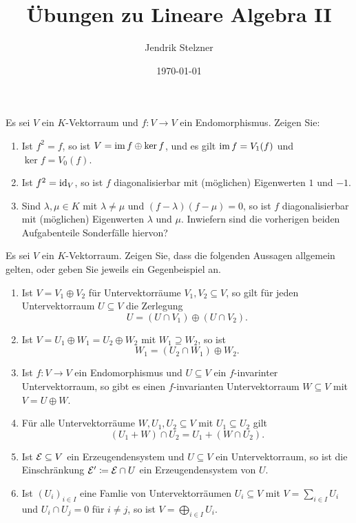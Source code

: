 \documentclass[a4paper,10pt]{scrartcl}
\title{Übungen zu Lineare Algebra II}
\author{Jendrik Stelzner}
\date{\today}
\begin{document}
\maketitle





\begin{question}
  Es sei $V$ ein $K$-Vektorraum und $f \colon V \to V$ ein Endomorphismus.
  Zeigen Sie:
  \begin{enumerate}[leftmargin=*]
    \item
      Ist $f^2 = f$, so ist $V = \operatorname{im} f \oplus \ker f$, und es gilt $\operatorname{im} f = V_1(f)$ und $\ker f = V_0(f)$.
    \item
      Ist $f^2 = \operatorname{id}_V$, so ist $f$ diagonalisierbar mit (möglichen) Eigenwerten $1$ und $-1$.
    \item
      Sind $\lambda, \mu \in K$ mit $\lambda \neq \mu$ und $(f-\lambda)(f-\mu) = 0$, so ist $f$ diagonalisierbar mit (möglichen) Eigenwerten $\lambda$ und $\mu$.
      Inwiefern sind die vorherigen beiden Aufgabenteile Sonderfälle hiervon?
  \end{enumerate}
\end{question}


\begin{question}
  Es sei $V$ ein $K$-Vektorraum.
  Zeigen Sie, dass die folgenden Aussagen allgemein gelten, oder geben Sie jeweils ein Gegenbeispiel an.
  \begin{enumerate}[leftmargin=*]
    \item
      Ist $V = V_1 \oplus V_2$ für Untervektorräume $V_1, V_2 \subseteq V$, so gilt für jeden Untervektorraum $U \subseteq V$ die Zerlegung
      \[
        U = (U \cap V_1) \oplus (U \cap V_2).
      \]
    \item
      Ist $V = U_1 \oplus W_1 = U_2 \oplus W_2$ mit $W_1 \supseteq W_2$, so ist
      \[
        W_1 = (U_2 \cap W_1) \oplus W_2.
      \]
    \item
      Ist $f \colon V \to V$ ein Endomorphismus und $U \subseteq V$ ein $f$-invarinter Untervektorraum, so gibt es einen $f$-invarianten Untervektorraum $W \subseteq V$ mit $V = U \oplus W$.
    \item
      Für alle Untervektorräume $W, U_1, U_2 \subseteq V$ mit $U_1 \subseteq U_2$ gilt
      \[
        (U_1 + W) \cap U_2 =  U_1 + (W \cap U_2).
      \]
    \item
      Ist $\mathcal{E} \subseteq V$ ein Erzeugendensystem und $U \subseteq V$ ein Untervektorraum, so ist die Einschränkung $\mathcal{E}' \coloneqq \mathcal{E} \cap U$ ein Erzeugendensystem von $U$.
    \item
      Ist $(U_i)_{i \in I}$ eine Famlie von Untervektorräumen $U_i \subseteq V$ mit $V = \sum_{i \in I} U_i$ und $U_i \cap U_j = 0$ für $i \neq j$, so ist $V = \bigoplus_{i \in I} U_i$.
  \end{enumerate}
\end{question}
\end{document}

